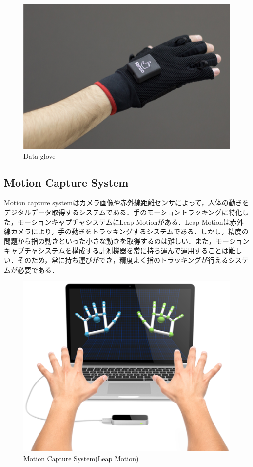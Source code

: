 \begin{figure}[H]
  \centering
  \includegraphics[width=0.6\linewidth]{fig/ch1/dataglove}
  \caption{Data glove}
  \label{fig:Data glove}
\end{figure}

\subsection*{Motion Capture System}
Motion capture systemはカメラ画像や赤外線距離センサによって，人体の動きをデジタルデータ取得するシステムである．手のモーショントラッキングに特化した，モーションキャプチャシステムにLeap Motionがある．Leap Motionは赤外線カメラにより，手の動きをトラッキングするシステムである．しかし，精度の問題から指の動きといった小さな動きを取得するのは難しい．また，モーションキャプチャシステムを構成する計測機器を常に持ち運んで運用することは難しい．そのため，常に持ち運びができ，精度よく指のトラッキングが行えるシステムが必要である．


\begin{figure}[H]
  \centering
  \includegraphics[width=0.6\linewidth]{fig/ch1/mcs}
  \caption{Motion Capture System(Leap Motion)}
  \label{fig:Motion Capture System}
\end{figure}


